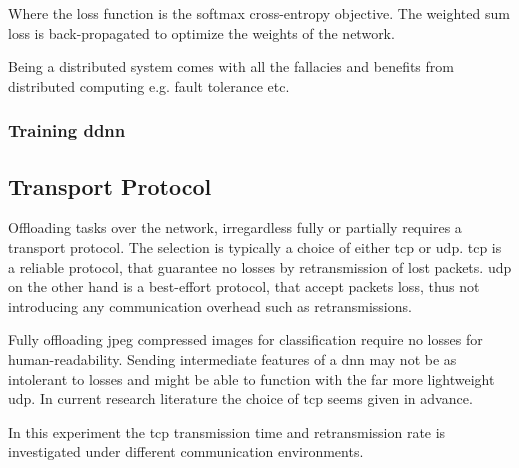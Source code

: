 Where the loss function is the softmax cross-entropy objective.
The weighted sum loss is back-propagated to optimize the weights of the network. 

Being a distributed system comes with all the fallacies and benefits from distributed computing e.g. fault tolerance etc.

\subsubsection{Training \gls{ddnn}}

\subsection{Transport Protocol} 

Offloading tasks over the network, irregardless fully or partially requires a transport protocol. The selection is typically a choice of either \gls{tcp} or \gls{udp}. \gls{tcp} is a reliable protocol, that guarantee no losses by retransmission of lost packets. \gls{udp} on the other hand is a best-effort protocol, that accept packets loss, thus not introducing any communication overhead such as retransmissions. 


Fully offloading \gls{jpeg} compressed images for classification require no losses for human-readability. Sending intermediate features of a \gls{dnn} may not be as intolerant to losses and might be able to function with the far more lightweight \gls{udp}. In current research literature the choice of \gls{tcp} seems given in advance.  


In this experiment the \gls{tcp} transmission time and retransmission rate is investigated under different communication environments. 